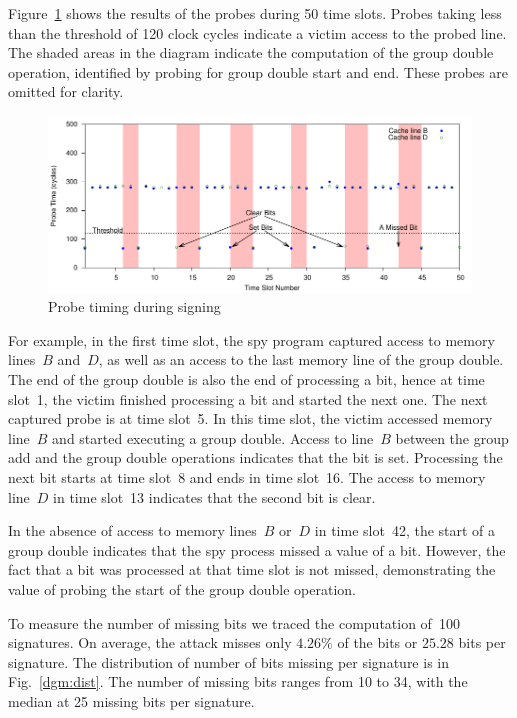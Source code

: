 \documentclass[twocolumn]{svjour3}
\begin{document}
Figure~\ref{dgm:timing} shows the results of the probes during 50 time slots.
Probes taking less than the threshold of 120 clock cycles indicate a victim access to the probed line.
The shaded areas in the diagram indicate the computation of the group double operation, identified
by probing for group double start and end.
These probes are omitted for clarity.


\begin{figure}[htb]
\centering\includegraphics[width=\textwidth]{images/timing}
\caption{Probe timing during signing\label{dgm:timing}}
\end{figure}

For example, in the first time slot, the spy program captured access to memory lines~$B$ and~$D$, as well as an access
to the last memory line of the group double.
The end of the group double is also the end of processing a bit, hence at time slot~1, the victim finished processing a bit
and started the next one.
The next captured probe is at time slot~5.
In this time slot, the victim accessed memory line~$B$ and started executing a group double.  
Access to line~$B$ between the group add and the group double operations indicates that the bit is set.
Processing the next bit starts at time slot~8 and ends in time slot~16.
The access to memory line~$D$ in time slot~13 indicates that the second bit is clear.

In the absence of access to memory lines~$B$ or~$D$ in time slot~42, the start of a group double indicates
that the spy process missed a value of a bit.
However, the fact that a bit was processed at that time slot is not missed,
demonstrating the value of probing the start of the group double operation.

To measure the number of missing bits we traced the computation of~100 signatures.
On average, the attack misses only $4.26\%$ of the bits or $25.28$ bits per signature.
The distribution of number of bits missing per signature is in Fig.~\ref{dgm:dist}.
The number of missing bits ranges from 10 to 34, with the median at 25 missing bits per signature.
\end{document}
